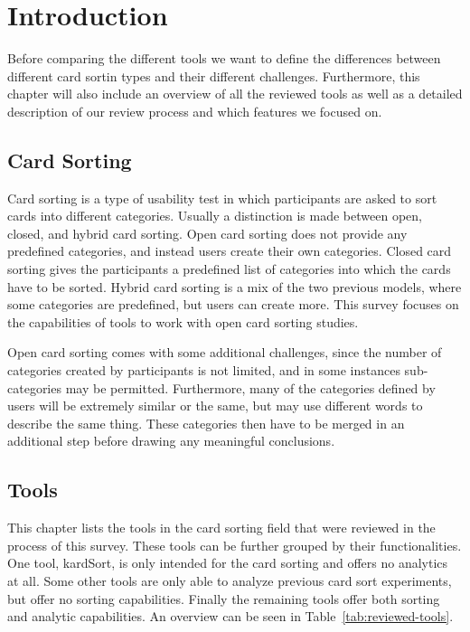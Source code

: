 \chapter{Introduction}

\label{chap:Intro}

Before comparing the different tools we want to define the differences between 
different card sortin types and their different challenges. Furthermore, this 
chapter will also include an overview of all the reviewed tools as well as a 
detailed description of our review process and which features we focused on.


\section{Card Sorting}

Card sorting is a type of usability test in which participants are
asked to sort cards into different categories. Usually a distinction
is made between open, closed, and hybrid card sorting. Open card
sorting does not provide any predefined categories, and instead users
create their own categories. Closed card sorting gives the
participants a predefined list of categories into which the cards have
to be sorted. Hybrid card sorting is a mix of the two previous models,
where some categories are predefined, but users can create more. This
survey focuses on the capabilities of tools to work with open card
sorting studies.

Open card sorting comes with some additional challenges, since the
number of categories created by participants is not limited, and in
some instances sub-categories may be permitted. Furthermore, many of
the categories defined by users will be extremely similar or the same,
but may use different words to describe the same thing. These
categories then have to be merged in an additional step before drawing
any meaningful conclusions.


\section{Tools}

This chapter lists the tools in the card sorting field that were
reviewed in the process of this survey. These tools can be further
grouped by their functionalities. One tool, kardSort, is only intended
for the card sorting and offers no analytics at all. Some other tools
are only able to analyze previous card sort experiments, but offer no
sorting capabilities. Finally the remaining tools offer both sorting
and analytic capabilities. An overview can be seen in
Table~\ref{tab:reviewed-tools}.

